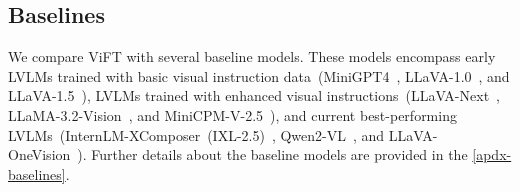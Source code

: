 \subsection{Baselines}

We compare ViFT with several baseline models. These models encompass early LVLMs trained with basic visual instruction data~(MiniGPT4~\cite{zhu2023minigpt}, LLaVA-1.0~\cite{liu2024visual}, and LLaVA-1.5~\cite{liu2024improved}), LVLMs trained with enhanced visual instructions~(LLaVA-Next~\cite{liu2024llavanext}, LLaMA-3.2-Vision~\cite{meta2024llama}, and MiniCPM-V-2.5~\cite{yao2024minicpm}), and current best-performing LVLMs~(InternLM-XComposer~(IXL-2.5)~\cite{zhang2024internlm}, Qwen2-VL~\cite{wang2024qwen2}, and LLaVA-OneVision~\cite{li2024llava}). 
Further details about the baseline models are provided in the \autoref{apdx-baselines}.






